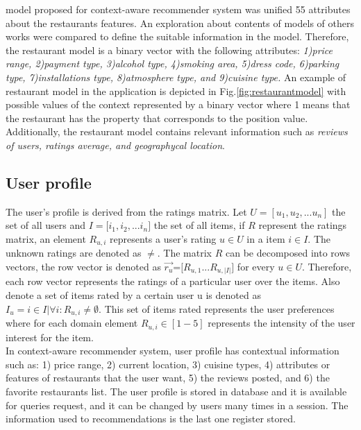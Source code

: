 model proposed for context-aware recommender system was unified 55
attributes about the restaurants features. An exploration about
contents of models of others works were compared to define the
suitable information in the model. Therefore, the restaurant model is
a binary vector with the following attributes: \textit{1)price range,
2)payment type, 3)alcohol type, 4)smoking area, 5)dress code,
6)parking type, 7)installations type, 8)atmosphere type, and 9)cuisine
type.} An example of restaurant model in the application is depicted
in Fig.\ref{fig:restaurantmodel} with possible values of the context
represented by a binary vector where 1 means that the restaurant has
the property that corresponds to the position value. Additionally, the
restaurant model contains relevant information such as \textit{reviews
of users, ratings average, and geographycal location}.

\begin{figure*}
\captionsetup{justification=centering,margin=2cm}
\centering
\setlength\fboxsep{0pt}
\setlength\fboxrule{0.7pt}
\caption{Example of system interface for restaurant model.}
\label{fig:restaurantmodel}   
\end{figure*}
\subsection{User profile} \label{sec:3.2}  

The user's profile is derived from the ratings matrix. Let
$U=[u_1,u_2,...u_n]$ the set of all users and $ I=[i_1,i_2,$...$i_n] $
the set of all items, if $R$ represent the ratings matrix,  an element
$R_{u,i}$ represents a user’s rating $u \in U$  in a item $i \in I$.
The unknown ratings are denoted as $\neq $. The matrix $R$ can be
decomposed into rows vectors, the row vector is denoted as $
\overrightarrow{r_u} $=$[R_{u,1}$...$R_{u,|I|}]$ for every $u \in U$.
Therefore, each row vector represents the ratings of a particular user
over the items. Also denote a set of items rated by a certain user u
is denoted as $ I_u = i \in I | \forall  i: R_{u,i} \neq \emptyset $.
This set of items rated represents the user preferences where for each
domain element $R_{u,i} \in [1-5]$ represents the intensity of the
user interest for  the item.\\  In context-aware recommender system,
user profile has contextual information such as: 1) price range, 2)
current location, 3) cuisine types, 4) attributes or features of
restaurants that the user want, 5) the reviews posted, and 6) the
favorite restaurants list. The user profile is stored in database and
it is available for queries request, and it can be changed by users
many times in a session. The information used to recommendations is
the last one register stored.

